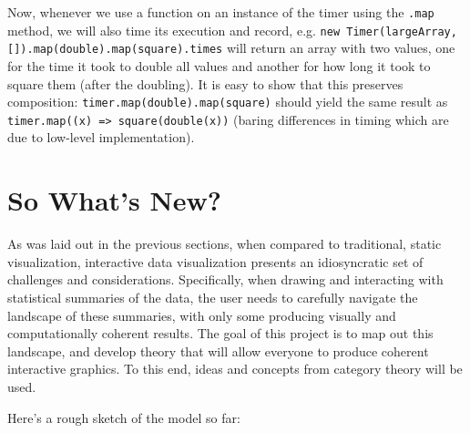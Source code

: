 \documentclass[12pt,a4paper]{article}
\begin{document}
Now, whenever we use a function on an instance of the timer using the \texttt{.map} method, we will also time its execution and record, e.g. \texttt{new Timer(largeArray, []).map(double).map(square).times} will return an array with two values, one for the time it took to double all values and another for how long it took to square them (after the doubling). It is easy to show that this preserves composition: \texttt{timer.map(double).map(square)} should yield the same result as \texttt{timer.map((x) => square(double(x))} (baring differences in timing which are due to low-level implementation).    


\section{So What's New?}
\label{sec:whatsnew}

As was laid out in the previous sections, when compared to traditional, static visualization, interactive data visualization presents an idiosyncratic set of challenges and considerations. Specifically, when drawing and interacting with statistical summaries of the data, the user needs to carefully navigate the landscape of these summaries, with only some producing visually and computationally coherent results. The goal of this project is to map out this landscape, and develop theory that will allow everyone to produce coherent interactive graphics. To this end, ideas and concepts from category theory will be used. 

Here's a rough sketch of the model so far:
\end{document}
